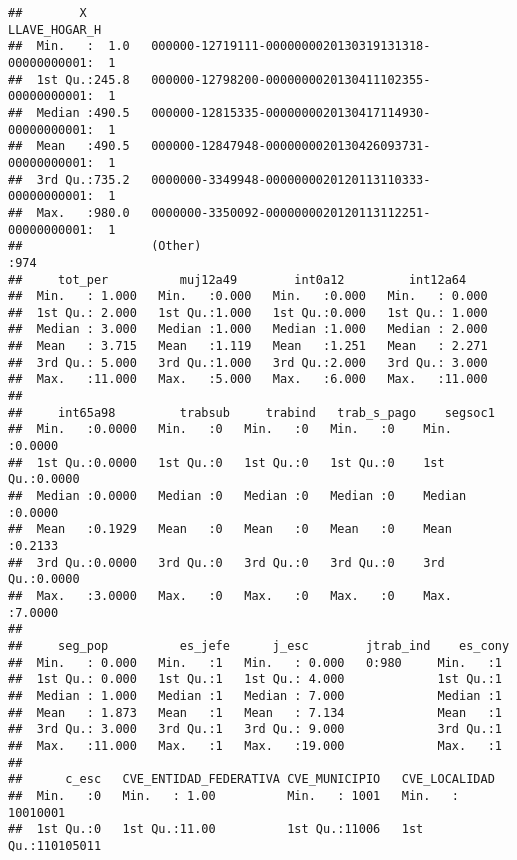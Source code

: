 \documentclass[11pt,]{article}
\begin{document}
\begin{verbatim}
##        X                                                    LLAVE_HOGAR_H
##  Min.   :  1.0   000000-12719111-0000000020130319131318-00000000001:  1  
##  1st Qu.:245.8   000000-12798200-0000000020130411102355-00000000001:  1  
##  Median :490.5   000000-12815335-0000000020130417114930-00000000001:  1  
##  Mean   :490.5   000000-12847948-0000000020130426093731-00000000001:  1  
##  3rd Qu.:735.2   0000000-3349948-0000000020120113110333-00000000001:  1  
##  Max.   :980.0   0000000-3350092-0000000020120113112251-00000000001:  1  
##                  (Other)                                           :974  
##     tot_per          muj12a49        int0a12         int12a64     
##  Min.   : 1.000   Min.   :0.000   Min.   :0.000   Min.   : 0.000  
##  1st Qu.: 2.000   1st Qu.:1.000   1st Qu.:0.000   1st Qu.: 1.000  
##  Median : 3.000   Median :1.000   Median :1.000   Median : 2.000  
##  Mean   : 3.715   Mean   :1.119   Mean   :1.251   Mean   : 2.271  
##  3rd Qu.: 5.000   3rd Qu.:1.000   3rd Qu.:2.000   3rd Qu.: 3.000  
##  Max.   :11.000   Max.   :5.000   Max.   :6.000   Max.   :11.000  
##                                                                   
##     int65a98         trabsub     trabind   trab_s_pago    segsoc1      
##  Min.   :0.0000   Min.   :0   Min.   :0   Min.   :0    Min.   :0.0000  
##  1st Qu.:0.0000   1st Qu.:0   1st Qu.:0   1st Qu.:0    1st Qu.:0.0000  
##  Median :0.0000   Median :0   Median :0   Median :0    Median :0.0000  
##  Mean   :0.1929   Mean   :0   Mean   :0   Mean   :0    Mean   :0.2133  
##  3rd Qu.:0.0000   3rd Qu.:0   3rd Qu.:0   3rd Qu.:0    3rd Qu.:0.0000  
##  Max.   :3.0000   Max.   :0   Max.   :0   Max.   :0    Max.   :7.0000  
##                                                                        
##     seg_pop          es_jefe      j_esc        jtrab_ind    es_cony 
##  Min.   : 0.000   Min.   :1   Min.   : 0.000   0:980     Min.   :1  
##  1st Qu.: 0.000   1st Qu.:1   1st Qu.: 4.000             1st Qu.:1  
##  Median : 1.000   Median :1   Median : 7.000             Median :1  
##  Mean   : 1.873   Mean   :1   Mean   : 7.134             Mean   :1  
##  3rd Qu.: 3.000   3rd Qu.:1   3rd Qu.: 9.000             3rd Qu.:1  
##  Max.   :11.000   Max.   :1   Max.   :19.000             Max.   :1  
##                                                                     
##      c_esc   CVE_ENTIDAD_FEDERATIVA CVE_MUNICIPIO   CVE_LOCALIDAD      
##  Min.   :0   Min.   : 1.00          Min.   : 1001   Min.   : 10010001  
##  1st Qu.:0   1st Qu.:11.00          1st Qu.:11006   1st Qu.:110105011  

\end{verbatim}
\end{document}
